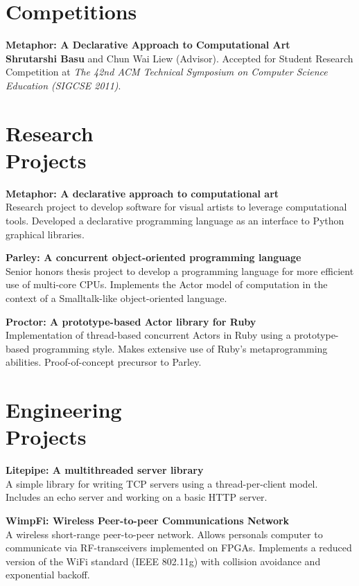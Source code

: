 \documentclass[margin,line]{resume}
\begin{document}
\begin{resume}
    \section{\mysidestyle Competitions}
    {\bf Metaphor: A Declarative Approach to Computational Art} \\
    {\bf Shrutarshi Basu} and Chun Wai Liew (Advisor). 
    Accepted for Student Research Competition at \emph{The 42nd ACM Technical
      Symposium on Computer Science Education (SIGCSE 2011)}.

    \section{\mysidestyle Research \\Projects}
    {\bf Metaphor: A declarative approach to computational art}\\
    Research project to develop software for visual artists to leverage
    computational tools. Developed a declarative programming language as an
    interface to Python graphical libraries.

    {\bf Parley: A concurrent object-oriented programming language}\\
    Senior honors thesis project to develop a programming language for more
    efficient use of multi-core CPUs. Implements the Actor model of computation
    in the context of a Smalltalk-like object-oriented language.

    {\bf Proctor: A prototype-based Actor library for Ruby} \\
    Implementation of thread-based concurrent Actors in Ruby using a
    prototype-based programming style. Makes extensive use of Ruby's
    metaprogramming abilities. Proof-of-concept precursor to Parley.

    \section{\mysidestyle Engineering \\Projects}
    {\bf Litepipe: A multithreaded server library} \\
    A simple library for writing TCP servers using a thread-per-client
    model. Includes an echo server and working on a basic HTTP server.

    {\bf WimpFi: Wireless Peer-to-peer Communications Network}\\
    A wireless short-range peer-to-peer network. Allows personals computer to
    communicate via RF-transceivers implemented on FPGAs. Implements a reduced
    version of the WiFi standard (IEEE 802.11g) with collision avoidance and
    exponential backoff.
    

\end{resume}
\end{document}
